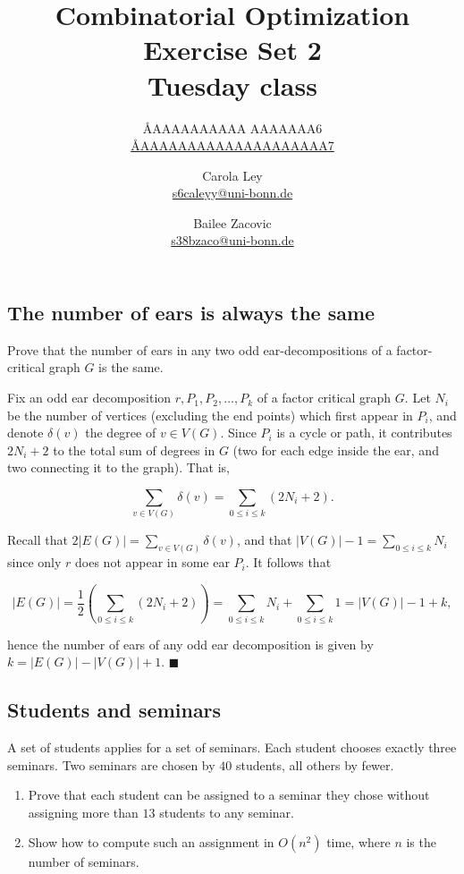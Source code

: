 \documentclass{article}
\title{Combinatorial Optimization \\ Exercise Set 2 \\ Tuesday class}
\author{
  \AA{AAAAAAAAAA AAAAAAA}{6} \\
  \href{mailto:\AA{AAAAAAAAAAAAAAAAAAAA}{7}}{\AA{AAAAAAAAAAAAAAAAAAAA}{7}}
  \and
  Carola Ley \\
  \href{mailto:s6caleyy@uni-bonn.de}{s6caleyy@uni-bonn.de}
  \and
  Bailee Zacovic \\
  \href{mailto:s38bzaco@uni-bonn.de}{s38bzaco@uni-bonn.de}
}
\begin{document}
  \maketitle

  \setcounter{section}{2}
  \subsection{The number of ears is always the same}
  \begin{centerframebox}
    Prove that the number of ears in any two odd ear-decompositions of a factor-critical graph $G$ is the same.
  \end{centerframebox}

Fix an odd ear decomposition $r, P_1, P_2, \dots, P_k$ of a factor critical graph $G.$ Let $N_i$ be the number of vertices (excluding the end points) which first appear in $P_i$, and denote $\delta(v)$ the degree of $v\in V(G)$. Since $P_i$ is a cycle or path, it contributes $2N_i+2$ to the total sum of degrees in $G$ (two for each edge inside the ear, and two connecting it to the graph). That is,

$$\sum_{v\in V(G)} \delta(v)=\sum_{0\leq i\leq k} (2N_i+2).$$

Recall that $2|E(G)|=\sum_{v\in V(G)} \delta(v)$, and that $|V(G)|-1=\sum_{0\leq i\leq k} N_i $ since only $r$ does not appear in some ear $P_i$. It follows that

$$|E(G)|=\frac{1}{2}\left(\sum_{0\leq i\leq k} (2N_i+2)\right)=\sum_{0\leq i\leq k} N_i+\sum_{0\leq i\leq k}1=|V(G)|-1+k,$$

hence the number of ears of any odd ear decomposition is given by $k=|E(G)|-|V(G)|+1.$ $\blacksquare$

  \subsection{Students and seminars}
  \begin{centerframebox}
    A set of students applies for a set of seminars. Each student chooses
    exactly three seminars. Two seminars are chosen by $40$ students, all others by
    fewer.

    \begin{enumerate}[label=(\alph*)]
      \item
      Prove that each student can be assigned to a seminar they chose without
      assigning more than $13$ students to any seminar.

      \item
      Show how to compute such an assignment in $O(n^2)$ time, where $n$ is the number of seminars.
    \end{enumerate}

  \end{centerframebox}
\end{document}

